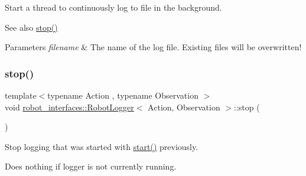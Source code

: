 Start a thread to continuously log to file in the background. 

\begin{DoxySeeAlso}{See also}
\hyperlink{classrobot__interfaces_1_1RobotLogger_a55ec7dcacd849adee53fa49a2a0c8234}{stop()} 
\end{DoxySeeAlso}

\begin{DoxyParams}{Parameters}
{\em filename} & The name of the log file. Existing files will be overwritten! \\
\hline
\end{DoxyParams}
\mbox{\label{classrobot__interfaces_1_1RobotLogger_a55ec7dcacd849adee53fa49a2a0c8234}} 
\subsubsection{\texorpdfstring{stop()}{stop()}}
{\footnotesize\ttfamily template$<$typename Action , typename Observation $>$ \\
void \hyperlink{classrobot__interfaces_1_1RobotLogger}{robot\+\_\+interfaces\+::\+Robot\+Logger}$<$ Action, Observation $>$\+::stop (\begin{DoxyParamCaption}{ }\end{DoxyParamCaption})\hspace{0.3cm}{\ttfamily [inline]}}



Stop logging that was started with {\ttfamily \hyperlink{classrobot__interfaces_1_1RobotLogger_a7a1b50c75aab3255ac7e6d412de833d1}{start()}} previously. 

Does nothing if logger is not currently running. \mbox{\label{classrobot__interfaces_1_1RobotLogger_ada7467fbac96a67ab798c4e6ef56c9b1}} 
